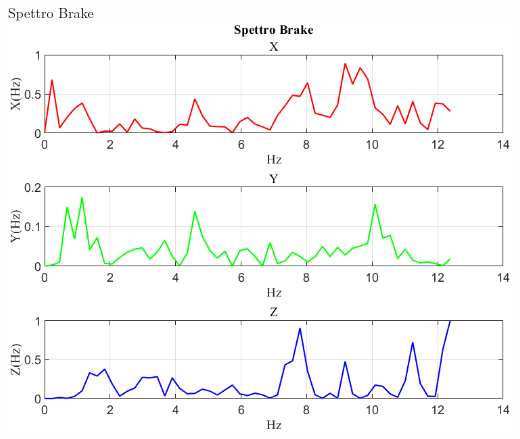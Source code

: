 \documentclass[beamer]{standalone}
\begin{document}
	\begin{frame}{{Spettro Brake}}
		\centering\includegraphics[height=.8\textheight]{figure/Acc/Trasformata/Spettro Brake}
	\end{frame}
	
\end{document}
